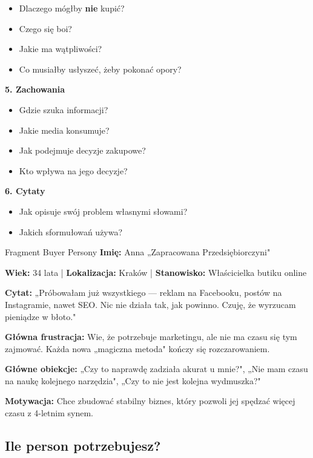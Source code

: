 \documentclass[
  12pt,
  a4paper,
  twoside,
  openright,
  12pt,
  DIV=12,
  BCOR=12mm]{scrbook}
\providecommand{\tightlist}{%
  \setlength{\itemsep}{0pt}\setlength{\parskip}{0pt}}\usepackage{longtable,booktabs,array}
\begin{document}
\begin{itemize}
\tightlist
\item
  Dlaczego mógłby \textbf{nie} kupić?
\item
  Czego się boi?
\item
  Jakie ma wątpliwości?
\item
  Co musiałby usłyszeć, żeby pokonać opory?
\end{itemize}

\textbf{5. Zachowania}

\begin{itemize}
\tightlist
\item
  Gdzie szuka informacji?
\item
  Jakie media konsumuje?
\item
  Jak podejmuje decyzje zakupowe?
\item
  Kto wpływa na jego decyzje?
\end{itemize}

\textbf{6. Cytaty}

\begin{itemize}
\tightlist
\item
  Jak opisuje swój problem własnymi słowami?
\item
  Jakich sformułowań używa?
\end{itemize}

\begin{przyklad}{Fragment Buyer Persony}
\textbf{Imię:} Anna „Zapracowana Przedsiębiorczyni"

\textbf{Wiek:} 34 lata | \textbf{Lokalizacja:} Kraków | \textbf{Stanowisko:} Właścicielka butiku online

\textbf{Cytat:} „Próbowałam już wszystkiego --- reklam na Facebooku, postów na Instagramie, nawet SEO. Nic nie działa tak, jak powinno. Czuję, że wyrzucam pieniądze w błoto."

\textbf{Główna frustracja:} Wie, że potrzebuje marketingu, ale nie ma czasu się tym zajmować. Każda nowa „magiczna metoda" kończy się rozczarowaniem.

\textbf{Główne obiekcje:} „Czy to naprawdę zadziała akurat u mnie?", „Nie mam czasu na naukę kolejnego narzędzia", „Czy to nie jest kolejna wydmuszka?"

\textbf{Motywacja:} Chce zbudować stabilny biznes, który pozwoli jej spędzać więcej czasu z 4-letnim synem.
\end{przyklad}

\subsection{Ile person potrzebujesz?}\label{ile-person-potrzebujesz}
\end{document}
